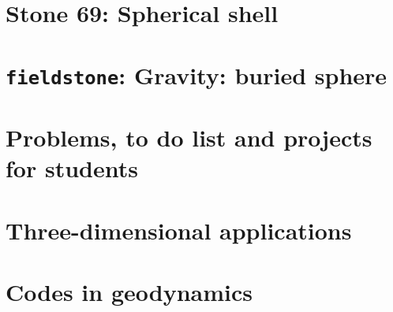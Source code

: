 \documentclass[a4paper]{article}
\begin{document}
\newpage %
\section*{
Stone 69: Spherical shell 
\label{f69}} 























\newpage %
\section{{\tt fieldstone}: Gravity: buried sphere} %

\newpage %
\section{Problems, to do list and projects for students} %

\appendix %

\newpage %
\section{Three-dimensional applications}  %
\newpage %
\section{Codes in geodynamics \label{app:codes} } %
\newpage %
\end{document}
